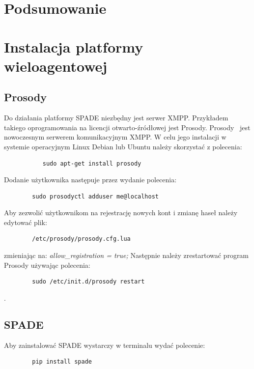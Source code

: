 \documentclass[11pt]{report}
\begin{document}
    \chapter{Podsumowanie}\label{ch:podsumowanie}

    \newpage
    \printbibliography[title={Bibliografia}]

    \appendix
    \newpage


    \chapter{Instalacja platformy wieloagentowej}


    \section{Prosody}
    Do działania platformy SPADE niezbędny jest serwer XMPP\@.
    Przykładem takiego oprogramowania na licencji otwarto-źródłowej jest Prosody.
    Prosody~\cite{prosody} jest nowoczesnym serwerem komunikacyjnym XMPP\@.
    W celu jego instalacji w systemie operacyjnym Linux Debian lub Ubuntu należy skorzystać z polecenia:
    \begin{verbatim}
           sudo apt-get install prosody
    \end{verbatim}

    Dodanie użytkownika następuje przez wydanie polecenia:
    \begin{verbatim}
        sudo prosodyctl adduser me@localhost
    \end{verbatim}

    Aby zezwolić użytkownikom na rejestrację nowych kont i zmianę haseł należy edytować plik:
    \begin{verbatim}
        /etc/prosody/prosody.cfg.lua
    \end{verbatim}
    zmieniając na: \textit{allow\_registration = true;}
    Następnie należy zrestartować program Prosody używając polecenia:
    \begin{verbatim}
        sudo /etc/init.d/prosody restart
    \end{verbatim}.


    \section{SPADE}

    Aby zainstalować SPADE wystarczy w terminalu wydać polecenie:
    \begin{verbatim}
        pip install spade
    \end{verbatim}
\end{document}
